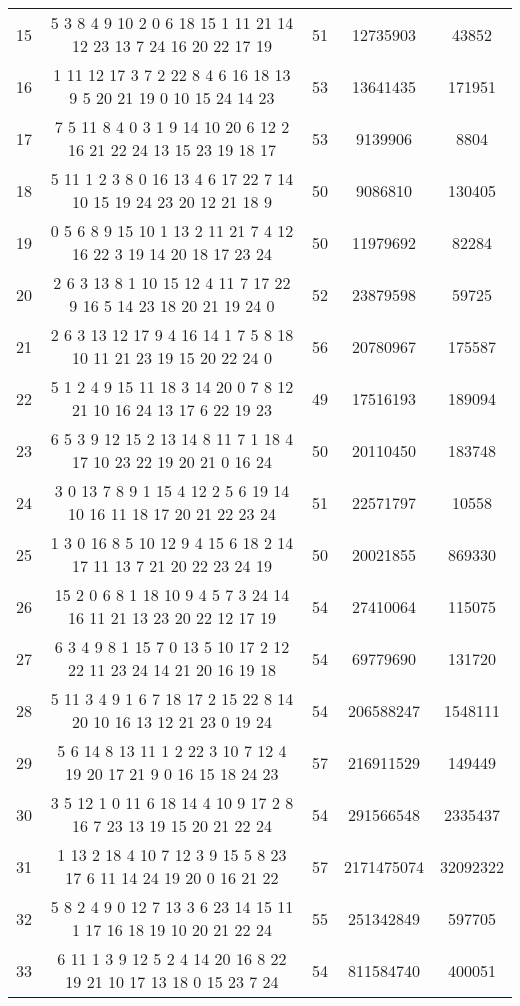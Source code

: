 \documentclass[a4paper,11pt,oneside,openany]{jsbook}
\begin{document}
\begin{table}[]
{\begin{tabular}{|c|c|c|c|c|}
15 & 5 3 8 4 9 10 2 0 6 18 15 1 11 21 14 12 23 13 7 24 16 20 22 17 19  & 51 & 12735903 & 43852 \\
16 & 1 11 12 17 3 7 2 22 8 4 6 16 18 13 9 5 20 21 19 0 10 15 24 14 23  & 53 & 13641435 & 171951 \\
17 & 7 5 11 8 4 0 3 1 9 14 10 20 6 12 2 16 21 22 24 13 15 23 19 18 17  & 53 & 9139906 & 8804 \\
18 & 5 11 1 2 3 8 0 16 13 4 6 17 22 7 14 10 15 19 24 23 20 12 21 18 9  & 50 & 9086810 & 130405 \\
19 & 0 5 6 8 9 15 10 1 13 2 11 21 7 4 12 16 22 3 19 14 20 18 17 23 24  & 50 & 11979692 & 82284 \\
20 & 2 6 3 13 8 1 10 15 12 4 11 7 17 22 9 16 5 14 23 18 20 21 19 24 0  & 52 & 23879598 & 59725 \\
21 & 2 6 3 13 12 17 9 4 16 14 1 7 5 8 18 10 11 21 23 19 15 20 22 24 0  & 56 & 20780967 & 175587 \\
22 & 5 1 2 4 9 15 11 18 3 14 20 0 7 8 12 21 10 16 24 13 17 6 22 19 23  & 49 & 17516193 & 189094 \\
23 & 6 5 3 9 12 15 2 13 14 8 11 7 1 18 4 17 10 23 22 19 20 21 0 16 24  & 50 & 20110450 & 183748 \\
24 & 3 0 13 7 8 9 1 15 4 12 2 5 6 19 14 10 16 11 18 17 20 21 22 23 24  & 51 & 22571797 & 10558 \\
25 & 1 3 0 16 8 5 10 12 9 4 15 6 18 2 14 17 11 13 7 21 20 22 23 24 19  & 50 & 20021855 & 869330 \\
26 & 15 2 0 6 8 1 18 10 9 4 5 7 3 24 14 16 11 21 13 23 20 22 12 17 19  & 54 & 27410064 & 115075 \\
27 & 6 3 4 9 8 1 15 7 0 13 5 10 17 2 12 22 11 23 24 14 21 20 16 19 18  & 54 & 69779690 & 131720 \\
28 & 5 11 3 4 9 1 6 7 18 17 2 15 22 8 14 20 10 16 13 12 21 23 0 19 24  & 54 & 206588247 & 1548111 \\
29 & 5 6 14 8 13 11 1 2 22 3 10 7 12 4 19 20 17 21 9 0 16 15 18 24 23  & 57 & 216911529 & 149449 \\
30 & 3 5 12 1 0 11 6 18 14 4 10 9 17 2 8 16 7 23 13 19 15 20 21 22 24  & 54 & 291566548 & 2335437 \\
31 & 1 13 2 18 4 10 7 12 3 9 15 5 8 23 17 6 11 14 24 19 20 0 16 21 22  & 57 & 2171475074 & 32092322 \\
32 & 5 8 2 4 9 0 12 7 13 3 6 23 14 15 11 1 17 16 18 19 10 20 21 22 24  & 55 & 251342849 & 597705 \\
33 & 6 11 1 3 9 12 5 2 4 14 20 16 8 22 19 21 10 17 13 18 0 15 23 7 24  & 54 & 811584740 & 400051 \\

\end{tabular}}
\end{table}
\end{document}
